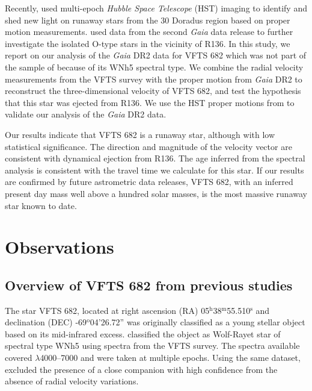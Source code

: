\documentclass[apjl,twocolumn]{emulateapj}
\DeclareRobustCommand{\Tabref}[1]{Table~\ref{#1}}
\begin{document}
Recently, \citet{platais:15,platais:18} used multi-epoch \emph{Hubble Space
  Telescope} (HST) imaging to identify and shed new light on runaway stars from
the 30 Doradus region based on proper motion
measurements. \citet{lennon:18} used data from the second \emph{Gaia}
data release \cite[DR2,][]{gaia:16,brown:18} to further investigate
the isolated O-type stars in the vicinity of R136. In this study, we
report on our analysis of the \emph{Gaia} DR2 data for VFTS 682 which
was not part of the sample of \citet{lennon:18} because of its WNh5
spectral type. We combine the radial velocity measurements from the
VFTS survey \citep[][]{evans:11} with the proper motion from
\emph{Gaia} DR2 to reconstruct the three-dimensional velocity of VFTS
682, and test the hypothesis that this star was ejected from R136. We
use the HST proper motions from \citet{platais:18} to validate our
analysis of the \emph{Gaia} DR2 data.

Our results indicate that VFTS 682 is a runaway star, although with
low statistical significance. The
direction and magnitude of the velocity vector are consistent with
dynamical ejection from R136. The age inferred from the spectral
analysis \citep[from][]{schneider:18} is consistent with the travel
time we calculate for this star. %
If our results are confirmed by future astrometric data releases, VFTS
682, with an inferred present day mass well above a hundred solar
masses, is the most massive runaway star known to date. 


\section{Observations}
\label{sec:sample}

\subsection{ Overview of VFTS 682 from previous studies \label{data:vfts683}}

The star VFTS 682, located at right ascension (RA)
05$^\mathrm{h}$38$^\mathrm{m}$55.510$^\mathrm{s}$  and declination
(DEC) \mbox{-69$^\mathrm{o}$04'26.72''} \citep[][see also
\Tabref{tab:vfts682} for updated coordinates from \emph{Gaia} DR2]{evans:11}
was originally classified as a young stellar object \citep{gruendl:09}
based on its mid-infrared excess. \citet{evans:11} classified the
object as Wolf-Rayet star of spectral type WNh5 using spectra from the
VFTS survey. The spectra available covered $\lambda$4000--7000 and
were taken at multiple epochs. Using the same dataset,
\citet{bestenlehner:11} excluded the presence of a close companion
with high confidence from the absence of radial velocity variations.
\end{document}
